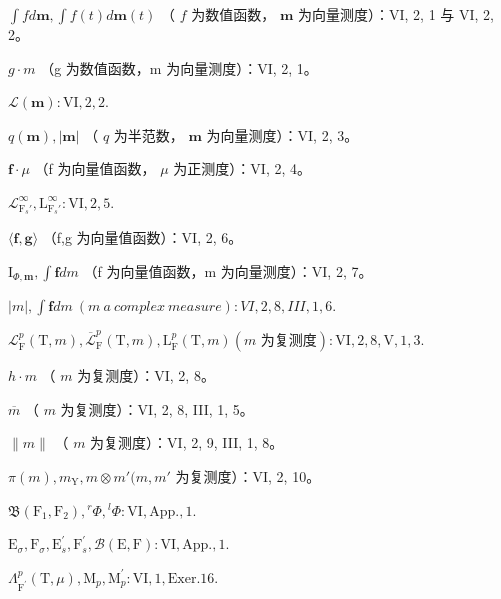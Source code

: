 \(\int f d\mathbf{m}, \int f(t) d\mathbf{m}(t)\) （ \(f\) 为数值函数， \(\mathbf{m}\) 为向量测度）：VI, 2, 1 与 VI, 2, 2。

\(g \cdot m\) （g 为数值函数，m 为向量测度）：VI, 2, 1。

\(\mathcal{L}(\mathbf{m}) : \mathrm{VI}, 2, 2.\)

\(q(\mathbf{m}), |\mathbf{m}|\) （ \(q\) 为半范数， \(\mathbf{m}\) 为向量测度）：VI, 2, 3。

\(\mathbf{f} \cdot \mu\) （f 为向量值函数， \(\mu\) 为正测度）：VI, 2, 4。

\(\mathcal{L}_{\mathrm{F}_s'}^{\infty}, \mathrm{L}_{\mathrm{F}_s'}^{\infty} : \mathrm{VI}, 2, 5.\)

\(\langle \mathbf{f},\mathbf{g}\rangle\) （f,g 为向量值函数）：VI, 2, 6。

\(\mathrm{I}_{\Phi ,\mathbf{m}},\int \mathbf{f}dm\) （f 为向量值函数，m 为向量测度）：VI, 2, 7。

\(|m|, \int \mathbf{f} dm \ (m \ a \ complex \ measure) : VI, 2, 8, III, 1, 6.\)

\(\mathcal{L}_{\mathrm{F}}^{p}(\mathrm{T},m), \overline{\mathcal{L}}_{\mathrm{F}}^{p}(\mathrm{T},m), \mathrm{L}_{\mathrm{F}}^{p}(\mathrm{T},m) (m \text{ 为复测度}): \mathrm{VI}, 2, 8, \mathrm{V}, 1, 3.\)

\(h \cdot m\) （ \(m\) 为复测度）：VI, 2, 8。

\(\overline{m}\) （ \(m\) 为复测度）：VI, 2, 8, III, 1, 5。

\(\| m\|\) （ \(m\) 为复测度）：VI, 2, 9, III, 1, 8。

\(\pi (m), m_{\mathrm{Y}}, m \otimes m' (m, m'\) 为复测度）：VI, 2, 10。

\(\mathfrak{B}(\mathrm{F}_{1},\mathrm{F}_{2}),{}^{r}\Phi,{}^{l}\Phi :\mathrm{VI},\mathrm{App.},1.\)

\(\mathrm{E}_{\sigma}, \mathrm{F}_{\sigma}, \mathrm{E}_{s}^{\prime}, \mathrm{F}_{s}^{\prime}, \mathcal{B}(\mathrm{E}, \mathrm{F}) : \mathrm{VI}, \mathrm{App.}, 1.\)

\(\Lambda_{\mathrm{F}^{\prime}}^{p}(\mathrm{T},\mu),\mathrm{M}_{p},\mathrm{M}_{p}^{\prime}:\mathrm{VI},1,\mathrm{Exer.}16.\)
